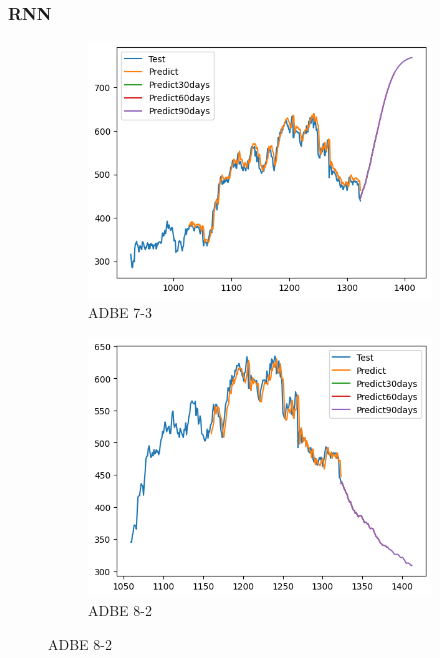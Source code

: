 \documentclass{ieeeojies}
\begin{document}
\subsubsection{RNN}
\begin{figure}[H]
    \centering
    \begin{subfigure}[h]{0.33\linewidth}
        \centering
        \includegraphics[width=\linewidth]{RNN Plot/RNN_ADBE_7_3.png}
        \caption{ADBE 7-3}
        \label{fig:adbe-7-3}
    \end{subfigure}%
    \hfill
    \begin{subfigure}[h]{0.33\linewidth}
        \centering
        \includegraphics[width=\linewidth]{RNN Plot/RNN_ADBE_8_2.png}
        \caption{ADBE 8-2}

\end{subfigure}
\end{figure}
\end{document}
